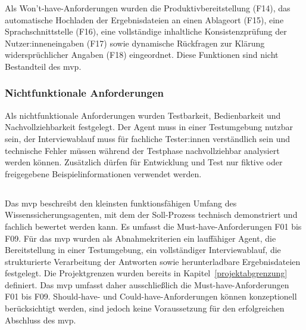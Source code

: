 \documentclass[
  10pt,
  ngerman,
  a4paper,
  toc=graduated,
  numbers=noenddot,
  headings=standardclasses,
  nonumberlist
]{scrartcl}
\begin{document}
Als Won't-have-Anforderungen wurden die Produktivbereitstellung (F14), das automatische Hochladen der Ergebnisdateien an einen Ablageort (F15), eine Sprachschnittstelle (F16), eine vollständige inhaltliche Konsistenzprüfung der Nutzer:inneneingaben (F17) sowie dynamische Rückfragen zur Klärung widersprüchlicher Angaben (F18) eingeordnet. Diese Funktionen sind nicht Bestandteil des \gls{mvp}.

\subsubsection{Nichtfunktionale Anforderungen}
\label{nichtfunktionale_anforderungen}

Als nichtfunktionale Anforderungen wurden Testbarkeit, Bedienbarkeit und Nachvollziehbarkeit festgelegt. Der Agent muss in einer Testumgebung nutzbar sein, der Interviewablauf muss für fachliche Tester:innen verständlich sein und technische Fehler müssen während der Testphase nachvollziehbar analysiert werden können. Zusätzlich dürfen für Entwicklung und Test nur fiktive oder freigegebene Beispielinformationen verwendet werden.

\subsection{}
\label{mvp_definition}

Das \gls{mvp} beschreibt den kleinsten funktionsfähigen Umfang des Wissenssicherungsagenten, mit dem der Soll-Prozess technisch demonstriert und fachlich bewertet werden kann. Es umfasst die Must-have-Anforderungen F01 bis F09. Für das \gls{mvp} wurden als Abnahmekriterien ein lauffähiger Agent, die Bereitstellung in einer Testumgebung, ein vollständiger Interviewablauf, die strukturierte Verarbeitung der Antworten sowie herunterladbare Ergebnisdateien festgelegt. Die Projektgrenzen wurden bereits in Kapitel~\ref{projektabgrenzung} definiert. Das \gls{mvp} umfasst daher ausschließlich die Must-have-Anforderungen F01 bis F09. Should-have- und Could-have-Anforderungen können konzeptionell berücksichtigt werden, sind jedoch keine Voraussetzung für den erfolgreichen Abschluss des \gls{mvp}.

\end{document}
